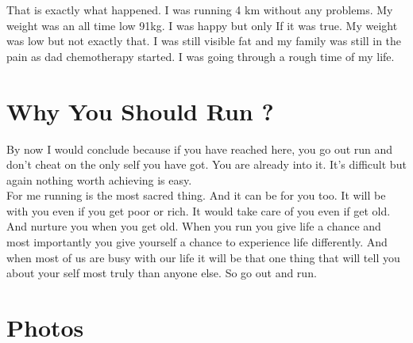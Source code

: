 \documentclass[]{article}
\begin{document}
That is exactly what happened. I was running 4 km without any problems. My weight was an all time low 91kg. I was happy but only If it was true. My weight was low but not exactly that. I was still visible fat and my family was still in the pain as dad chemotherapy started. I was going through a rough time of my life.


\section*{Why You Should Run ?}
By now I would conclude because if you have reached here, you go out run and don't cheat on the only self you have got. You are already into it. It's difficult but again nothing worth achieving is easy. \\
For me running is the most sacred thing. And it can be for you too. It will be with you even if you get poor or rich. It would take care of you even if get old. And nurture you when you get old. When you run you give life a chance and most importantly you give yourself a chance to experience life differently. And when most of us are busy with our life it will be that one thing that will tell you about your self most truly than anyone else. So go out and run. 



\newpage
\section{Photos}
\end{document}
